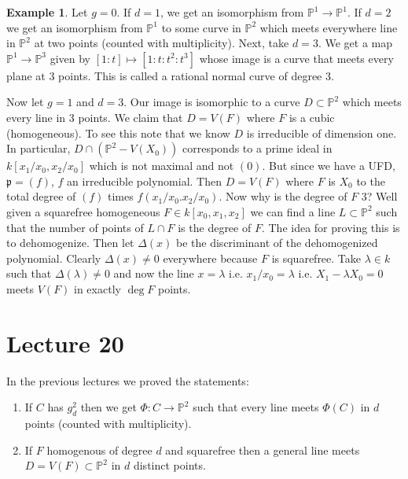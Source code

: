 \documentclass{article}
\newcommand{\Proj}{\mathbb{P}}
\newcommand{\fr}{\mathfrak}
\theoremstyle{plain}
\theoremstyle{definition}
\newtheorem{exmp}{Example}
\theoremstyle{remark}
\begin{document}
\begin{exmp}
Let $g=0$. If $d=1$, we get an isomorphism from $\Proj^1\to\Proj^1$. If $d=2$ we get an isomorphism from $\Proj^1$ to some curve in $\Proj^2$ which meets everywhere line in $\Proj^2$ at two points (counted with multiplicity). Next, take $d=3$. We get a map $\Proj^1\to\Proj^3$ given by $[1:t]\mapsto [1:t:t^2:t^3]$ whose image is a curve that meets every plane at 3 points. This is called a rational normal curve of degree 3.

Now let $g=1$ and $d=3$. Our image is isomorphic to a curve $D\subset \Proj^2$ which meets every line in 3 points. We claim that $D=V(F)$ where $F$ is a cubic (homogeneous). To see this note that we know $D$ is irreducible of dimension one. In particular, $D\cap (\Proj^2-V(X_0))$ corresponds to a prime ideal in $k[x_1/x_0,x_2/x_0]$ which is not maximal and not $(0)$. But since we have a UFD, $\fr p=(f)$, $f$ an irreducible polynomial. Then $D=V(F)$ where $F$  is $X_0$ to the total degree of $(f)$ times $f(x_1/x_0.x_2/x_0)$. Now why is the degree of $F$ 3? Well given a squarefree homogeneous $F\in k[x_0,x_1,x_2]$ we can find a line $L\subset \Proj^2$ such that the number of points of $L\cap F$ is the degree of $F$. The idea for proving this is to dehomogenize. Then let $\Delta(x)$ be the discriminant of the dehomogenized polynomial. Clearly $\Delta(x)\neq 0$ everywhere because $F$ is squarefree. Take $\lambda\in k$ such that $\Delta(\lambda)\neq 0$ and now the line $x=\lambda$ i.e. $x_1/x_0=\lambda$ i.e. $X_1-\lambda X_0=0$ meets $V(F)$ in exactly $\deg F$ points.
\end{exmp}



\section*{Lecture 20}
In the previous lectures we proved the statements:
\begin{enumerate} [(1)]
\item If $C$ has $g^2_d$ then we get $\Phi : C \to \Proj^2$ such that every line meets $\Phi(C)$ in $d$ points (counted with multiplicity).
\item If $F$ homogenous of degree $d$ and squarefree then a general line meets $D = V(F) \subset \Proj^2$ in $d$ distinct points.
\end{enumerate}
\end{document}
